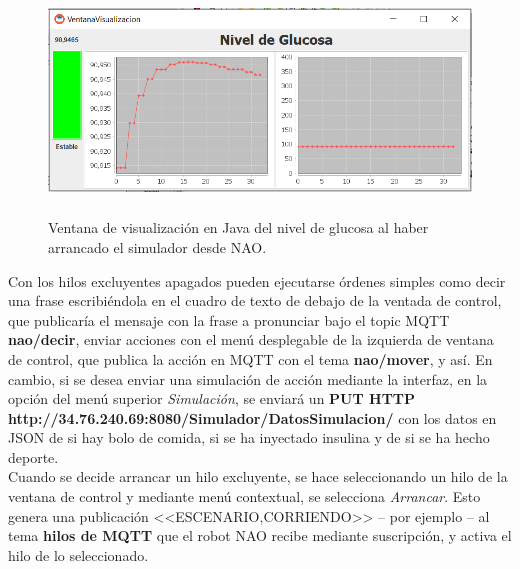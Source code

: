 \documentclass[12pt,spanish,listoffigures,listoftables]{tfgetsinf}
\begin{document}
\begin{figure}[!h]
	\centering
	\includegraphics[height=6cm]{img/ventanavisualizacion2}
	\caption{Ventana de visualización en Java del nivel de glucosa al haber arrancado el simulador desde NAO.}
	\label{figura:ventanavisualizacion2}
\end{figure}

Con los hilos excluyentes apagados pueden ejecutarse órdenes simples como decir una frase escribiéndola en el cuadro de texto de debajo de la ventada de control, que publicaría el mensaje con la frase a pronunciar bajo el topic MQTT \textbf{nao/decir}, enviar acciones con el menú desplegable de la izquierda de ventana de control, que publica la acción en MQTT con el tema \textbf{nao/mover}, y así. En cambio, si se desea enviar una simulación de acción mediante la interfaz, en la opción del menú superior \textit{Simulación}, se enviará un \textbf{PUT HTTP http://34.76.240.69:8080/Simulador/DatosSimulacion/} con los datos en JSON de si hay bolo de comida, si se ha inyectado insulina y de si se ha hecho deporte. \\

Cuando se decide arrancar un hilo excluyente, se hace seleccionando un hilo de la ventana de control y mediante menú contextual, se selecciona \textit{Arrancar}. Esto genera una publicación <<ESCENARIO,CORRIENDO>> -- por ejemplo -- al tema \textbf{hilos de MQTT} que el robot NAO recibe mediante suscripción, y activa el hilo de lo seleccionado. \\
\end{document}
